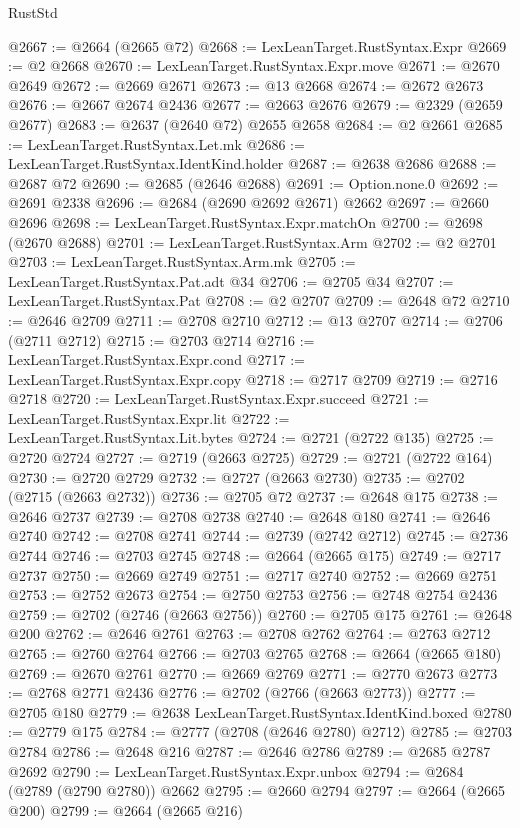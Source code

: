 \begin{lexlean}{RustStd}
\begin{coremodule}
@2667 := @2664 (@2665 @72)
@2668 := LexLeanTarget.RustSyntax.Expr
@2669 := @2 @2668
@2670 := LexLeanTarget.RustSyntax.Expr.move
@2671 := @2670 @2649
@2672 := @2669 @2671
@2673 := @13 @2668
@2674 := @2672 @2673
@2676 := @2667 @2674 @2436
@2677 := @2663 @2676
@2679 := @2329 (@2659 @2677)
@2683 := @2637 (@2640 @72) @2655 @2658
@2684 := @2 @2661
@2685 := LexLeanTarget.RustSyntax.Let.mk
@2686 := LexLeanTarget.RustSyntax.IdentKind.holder
@2687 := @2638 @2686
@2688 := @2687 @72
@2690 := @2685 (@2646 @2688)
@2691 := Option.none.{0}
@2692 := @2691 @2338
@2696 := @2684 (@2690 @2692 @2671) @2662
@2697 := @2660 @2696
@2698 := LexLeanTarget.RustSyntax.Expr.matchOn
@2700 := @2698 (@2670 @2688)
@2701 := LexLeanTarget.RustSyntax.Arm
@2702 := @2 @2701
@2703 := LexLeanTarget.RustSyntax.Arm.mk
@2705 := LexLeanTarget.RustSyntax.Pat.adt @34
@2706 := @2705 @34
@2707 := LexLeanTarget.RustSyntax.Pat
@2708 := @2 @2707
@2709 := @2648 @72
@2710 := @2646 @2709
@2711 := @2708 @2710
@2712 := @13 @2707
@2714 := @2706 (@2711 @2712)
@2715 := @2703 @2714
@2716 := LexLeanTarget.RustSyntax.Expr.cond
@2717 := LexLeanTarget.RustSyntax.Expr.copy
@2718 := @2717 @2709
@2719 := @2716 @2718
@2720 := LexLeanTarget.RustSyntax.Expr.succeed
@2721 := LexLeanTarget.RustSyntax.Expr.lit
@2722 := LexLeanTarget.RustSyntax.Lit.bytes
@2724 := @2721 (@2722 @135)
@2725 := @2720 @2724
@2727 := @2719 (@2663 @2725)
@2729 := @2721 (@2722 @164)
@2730 := @2720 @2729
@2732 := @2727 (@2663 @2730)
@2735 := @2702 (@2715 (@2663 @2732))
@2736 := @2705 @72
@2737 := @2648 @175
@2738 := @2646 @2737
@2739 := @2708 @2738
@2740 := @2648 @180
@2741 := @2646 @2740
@2742 := @2708 @2741
@2744 := @2739 (@2742 @2712)
@2745 := @2736 @2744
@2746 := @2703 @2745
@2748 := @2664 (@2665 @175)
@2749 := @2717 @2737
@2750 := @2669 @2749
@2751 := @2717 @2740
@2752 := @2669 @2751
@2753 := @2752 @2673
@2754 := @2750 @2753
@2756 := @2748 @2754 @2436
@2759 := @2702 (@2746 (@2663 @2756))
@2760 := @2705 @175
@2761 := @2648 @200
@2762 := @2646 @2761
@2763 := @2708 @2762
@2764 := @2763 @2712
@2765 := @2760 @2764
@2766 := @2703 @2765
@2768 := @2664 (@2665 @180)
@2769 := @2670 @2761
@2770 := @2669 @2769
@2771 := @2770 @2673
@2773 := @2768 @2771 @2436
@2776 := @2702 (@2766 (@2663 @2773))
@2777 := @2705 @180
@2779 := @2638 LexLeanTarget.RustSyntax.IdentKind.boxed
@2780 := @2779 @175
@2784 := @2777 (@2708 (@2646 @2780) @2712)
@2785 := @2703 @2784
@2786 := @2648 @216
@2787 := @2646 @2786
@2789 := @2685 @2787 @2692
@2790 := LexLeanTarget.RustSyntax.Expr.unbox
@2794 := @2684 (@2789 (@2790 @2780)) @2662
@2795 := @2660 @2794
@2797 := @2664 (@2665 @200)
@2799 := @2664 (@2665 @216)

\end{coremodule}
\end{lexlean}
